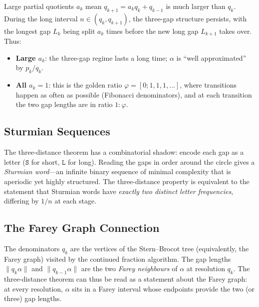 Large partial quotients $a_k$ mean $q_{k+1} = a_k q_k + q_{k-1}$ is much larger than $q_k$.
During the long interval $n \in (q_k, q_{k+1})$, the three-gap structure persists,
with the longest gap $L_k$ being split $a_k$ times before the new long gap $L_{k+1}$
takes over.  Thus:
\begin{itemize}
  \item \textbf{Large $a_k$}: the three-gap regime lasts a long time; $\alpha$ is
        ``well approximated'' by $p_k/q_k$.
  \item \textbf{All $a_k = 1$}: this is the golden ratio $\varphi = [0;1,1,1,\ldots]$,
        where transitions happen as often as possible (Fibonacci denominators),
        and at each transition the two gap lengths are in ratio $1:\varphi$.
\end{itemize}

\subsection*{Sturmian Sequences}

The three-distance theorem has a combinatorial shadow: encode each gap as a letter
($\mathtt{S}$ for short, $\mathtt{L}$ for long).  Reading the gaps in order around
the circle gives a \emph{Sturmian word}---an infinite binary sequence of minimal
complexity that is aperiodic yet highly structured.  The three-distance property
is equivalent to the statement that Sturmian words have \emph{exactly two distinct
letter frequencies}, differing by $1/n$ at each stage.

\subsection*{The Farey Graph Connection}

The denominators $q_k$ are the vertices of the Stern--Brocot tree (equivalently,
the Farey graph) visited by the continued fraction algorithm.  The gap lengths
$\|q_k \alpha\|$ and $\|q_{k-1}\alpha\|$ are the two \emph{Farey neighbours} of
$\alpha$ at resolution $q_k$.  The three-distance theorem can thus be read as a
statement about the Farey graph: at every resolution, $\alpha$ sits in a Farey
interval whose endpoints provide the two (or three) gap lengths.
